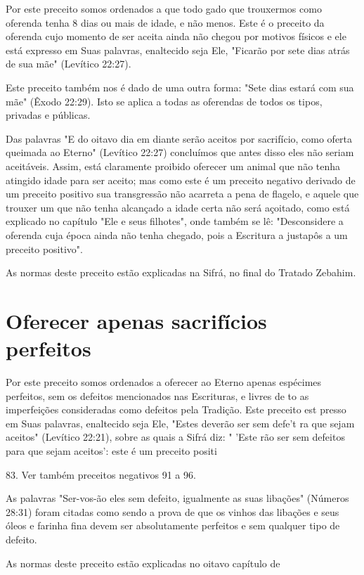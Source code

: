 \begin{itemize}
\begin{enumrate}
\begin{itemize}
\begin{itemize}
Por este preceito somos ordenados a que todo gado que trouxer­mos como
oferenda tenha 8 dias ou mais de idade, e não menos. Este é o pre­ceito
da oferenda cujo momento de ser aceita ainda não chegou por motivos
físicos e ele está expresso em Suas palavras, enaltecido seja Ele,
"Ficarão por sete dias atrás de sua mãe" (Levítico 22:27).

Este preceito também nos é dado de uma outra forma: "Sete dias estará
com sua mãe" (Êxodo 22:29). Isto se aplica a todas as oferendas de todos
os tipos, privadas e públicas.

Das palavras "E do oitavo dia em diante serão aceitos por sacrifício,
como oferta queimada ao Eterno" (Levítico 22:27) concluímos que antes
disso eles não seriam aceitáveis. Assim, está claramente proibido
oferecer um animal que não tenha atingido idade para ser aceito; mas
como este é um preceito ne­gativo derivado de um preceito positivo sua
transgressão não acarreta a pena de flagelo, e aquele que trouxer um que
não tenha alcançado a idade certa não será açoitado, como está explicado
no capítulo "Ele e seus filhotes", onde tam­bém se lê: "Desconsidere a
oferenda cuja época ainda não tenha chegado, pois a Escritura a justapôs
a um preceito positivo".

As normas deste preceito estão explicadas na Sifrá, no final do Tra­tado
Zebahim.

\section{Oferecer apenas sacrifícios perfeitos}

Por este preceito somos ordenados a oferecer ao Eterno apenas espé­cimes
perfeitos, sem os defeitos mencionados nas Escrituras, e livres de to as
imperfeições consideradas como defeitos pela Tradição. Este preceito est
presso em Suas palavras, enaltecido seja Ele, "Estes deverão ser sem
defe't ra que sejam aceitos" (Levítico 22:21), sobre as quais a Sifrá
diz: " 'Este rão ser sem defeitos para que sejam aceitos': este é um
preceito positi

83. Ver também preceitos negativos 91 a 96.



As palavras "Ser-vos-ão eles sem defeito, igualmente as suas libações"
(Números 28:31) foram citadas como sendo a prova de que os vinhos das
liba­ções e seus óleos e farinha fina devem ser absolutamente perfeitos
e sem qual­quer tipo de defeito.


As normas deste preceito estão explicadas no oitavo capítulo de



\end{itemize}
\end{itemize}
\end{enumrate}
\end{itemize}
